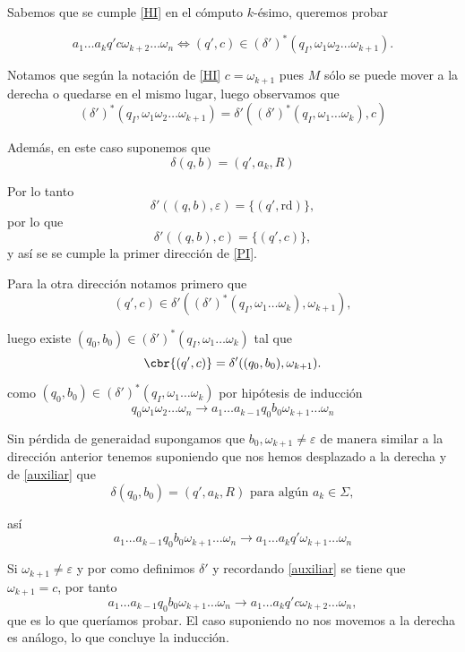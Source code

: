 \documentclass{article}
\begin{document}
Sabemos que se cumple \eqref{HI} en el cómputo $k$-ésimo, queremos probar

\[
    a_1\dots a_{k} q'c\omega_{k+2}\dots \omega_n\Leftrightarrow (q',c)\in(\delta')^{\ast}(q_I,\omega_1\omega_2\dots\omega_{k+1}).
\]

Notamos que según la notación de \eqref{HI} $c=\omega_{k+1}$ pues $M$ sólo se puede mover a la derecha o quedarse en el mismo lugar, luego observamos que
\begin{equation}
    \label{PI}
    (\delta')^{\ast}(q_I,\omega_1\omega_2\dots\omega_{k+1})=\delta'((\delta')^{\ast}(q_I,\omega_1\dots\omega_k),c)
\end{equation}

Además, en este caso suponemos que 
\[
    \delta(q,b)=(q',a_k,R)
\]

Por lo tanto 
\[
    \delta'((q,b),\varepsilon)=\{(q',\text{rd})\},
\]
por lo que 
\[
\delta'((q,b),c)=\{(q',c)\},    
\]
y así se se cumple la primer dirección de \ref{PI}.

Para la otra dirección notamos primero que
\[
(q',c)\in \delta'((\delta')^{\ast}(q_I,\omega_1\dots\omega_k),\omega_{k+1}),    
\]

luego existe $(q_0,b_0)\in (\delta')^{\ast}(q_I,\omega_1\dots\omega_k)$ tal que 
\begin{equation}
    \label{auxiliar}
    \cbr{(q',c)}=\delta'((q_0,b_0),\omega_{k+1}).
\end{equation}

como $(q_0,b_0)\in (\delta')^{\ast}(q_I,\omega_1\dots\omega_k)$ por hipótesis de inducción  
\[
    q_0\omega_1\omega_2\dots\omega_n\to a_1\dots a_{k-1}q_0b_0\omega_{k+1}\dots\omega_n
\]
 
Sin pérdida de generaidad supongamos que $b_0,\omega_{k+1}\neq \varepsilon$ de manera similar a la dirección anterior tenemos suponiendo que nos hemos desplazado a la derecha y de \eqref{auxiliar} que
\[
    \delta(q_0,b_0)=(q',a_{k},R) \text{ para algún }a_{k}\in \Sigma,
\]

así
\[
    a_1\dots a_{k-1}q_0b_0\omega_{k+1}\dots\omega_n\to a_1\dots a_{k}q'\omega_{k+1}\dots\omega_n
\]

Si $\omega_{k+1}\neq \varepsilon$ y por como definimos $\delta'$ y recordando \eqref{auxiliar} se tiene que $\omega_{k+1}=c$, por tanto 
\[
    a_1\dots a_{k-1}q_0b_0\omega_{k+1}\dots\omega_n\to a_1\dots a_{k}q'c\omega_{k+2}\dots\omega_n,
\]
que es lo que queríamos probar. El caso suponiendo no nos movemos a la derecha es análogo, lo que concluye la inducción. 
\end{document}
